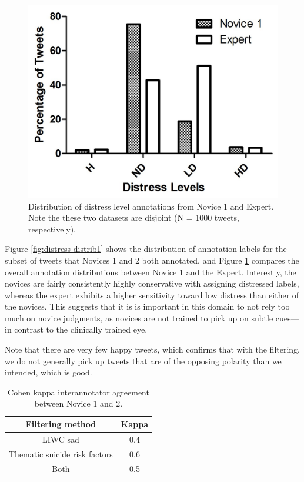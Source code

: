 \documentclass[11pt]{article}
\begin{document}
\begin{figure}[h]
\centering
\includegraphics[scale=0.65]{ChrisMegan4Cat.jpg}
\caption{Distribution of distress level annotations from Novice 1 and Expert. Note the these two datasets are disjoint (N = 1000 tweets, respectively).}
\label{fig:distress-distrib2}
\end{figure}

Figure \ref{fig:distress-distrib1} shows the distribution of annotation labels for the subset of tweets that Novices 1 and 2 both annotated, and Figure \ref{fig:distress-distrib2} compares the overall annotation distributions between Novice 1 and the Expert. Interestly, the novices are fairly consistently highly conservative with assigning distressed labels, whereas the expert exhibits a higher sensitivity toward low distress than either of the novices. This suggests that it is is important in this domain to not rely too much on novice judgments, as novices are not trained to pick up on subtle cues---in contrast to the clinically trained eye.   

 Note that there are very few happy tweets, which confirms that with the filtering, we do not generally pick up tweets that are of the opposing polarity than we intended, which is good.


\begin{table}[h]
 \centering
\begin{tabular}{|c|c|}
\hline
\textbf{Filtering method}                    & \textbf{Kappa}  \\ \hline
LIWC sad              & 0.4 \\ \hline
Thematic suicide risk factors& 0.6 \\ \hline
Both               & 0.5 \\ \hline
\end{tabular}
\caption {Cohen kappa interannotator agreement between Novice 1 and 2.}
\label{tab:kappa}
\end{table}
\end{document}
